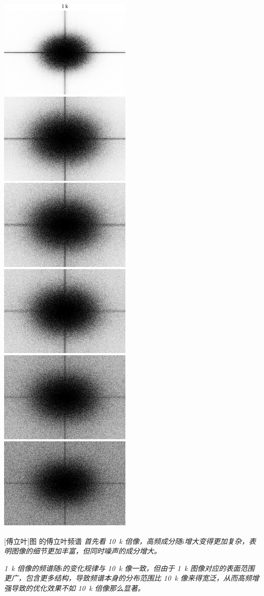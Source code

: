 \documentclass[aps,pre,12pt,preprint,%
	onecolumn,showpacs,showkeys,nofootinbib]{revtex4-1}
\begin{document}
\begin{minipage}{\linewidth}
\begin{minipage}[c]{.625\linewidth}
	\includegraphics[height=.9\paperheight]{grid1k.pdf}
	\end{minipage}
	\begin{minipage}[c]{.245\linewidth}
	[傅立叶]{图 \tup{\ref{fig:photoOriginal}} 的傅立叶频谱}
	\textit{\hphantom{说明}%
		首先看 \SI{10}{k} 倍像，高频成分随$i$增大变得更加复杂，表明图像的细节更加丰富，但同时噪声的成分增大。
	\vspace{-2ex}}\par
	\textit{\hphantom{分析}%
		\SI{1}{k} 倍像的频谱随$i$的变化规律与 \SI{10}{k} 像一致，但由于 \SI{1}{k} 图像对应的表面范围更广，包含更多结构，导致频谱本身的分布范围比 \SI{10}{k} 像来得宽泛，从而高频增强导致的优化效果不如 \SI{10}{k} 倍像那么显著。
	\vspace{1ex}}
	\label{fig:fourier}
	\end{minipage}
	\end{minipage}
\end{document}
